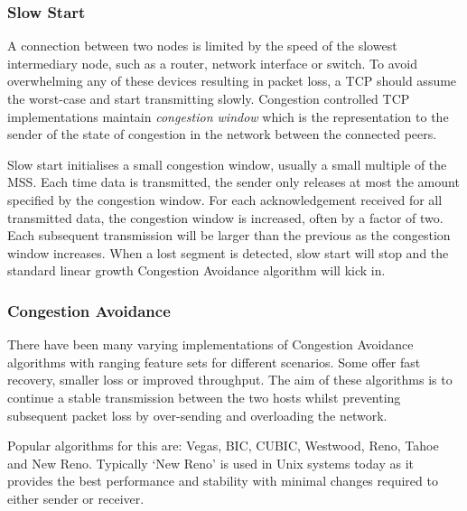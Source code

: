         \subsubsection{Slow Start}
            A connection between two nodes is limited by the speed of the slowest intermediary node, such as a router, network interface or switch. To avoid overwhelming any of these devices resulting in packet loss, a TCP should assume the worst-case and start transmitting slowly. Congestion controlled TCP implementations maintain \textit{congestion window} which is the representation to the sender of the state of congestion in the network between the connected peers.

            Slow start initialises a small congestion window, usually a small multiple of the MSS\@. Each time data is transmitted, the sender only releases at most the amount specified by the congestion window. For each acknowledgement received for all transmitted data, the congestion window is increased, often by a factor of two. Each subsequent transmission will be larger than the previous as the congestion window increases. When a lost segment is detected, slow start will stop and the standard linear growth Congestion Avoidance algorithm will kick in.

        \subsubsection{Congestion Avoidance}
            There have been many varying implementations of Congestion Avoidance algorithms with ranging feature sets for different scenarios. Some offer fast recovery, smaller loss or improved throughput. The aim of these algorithms is to continue a stable transmission between the two hosts whilst preventing subsequent packet loss by over-sending and overloading the network.

            Popular algorithms for this are: Vegas, BIC, CUBIC, Westwood, Reno, Tahoe and New Reno. Typically `New Reno' is used in Unix systems today as it provides the best performance and stability with minimal changes required to either sender or receiver.
